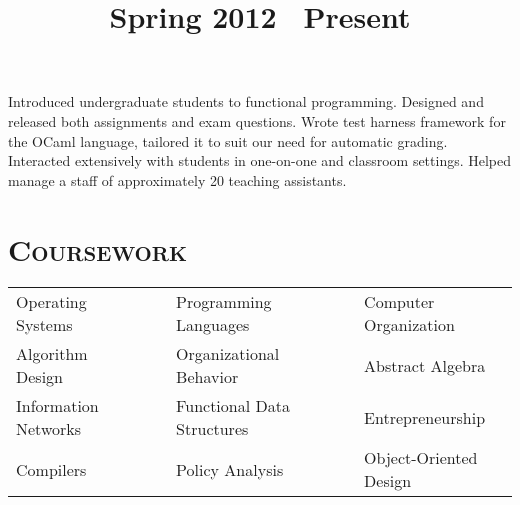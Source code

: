 \begin{resume}
\title{Spring 2012 \textendash\ Present}
\location{}
\begin{position}
Introduced undergraduate students to functional programming.
Designed and released both assignments and exam questions. 
Wrote test harness framework for the OCaml language, tailored it to suit our need for automatic grading.
Interacted extensively with students in one-on-one and classroom settings.
Helped manage a staff of approximately 20 teaching assistants.
\end{position}




\vspace{1.00cm}

\renewcommand*\arraystretch{1.2}
\section{\textsc{Coursework}}
 \begin{tabular}{lllll}
 Operating Systems      & \ \ & Programming Languages           & \ \ & Computer Organization \\
 Algorithm Design      & \ \ & Organizational Behavior       & \ \ & Abstract Algebra    \\
 Information Networks     & \ \ & Functional Data Structures       & \ \ &  Entrepreneurship       \\
 Compilers      & \ \ &  Policy Analysis   & \ \ & Object-Oriented Design   \\
 \end{tabular}\\


\end{resume}
